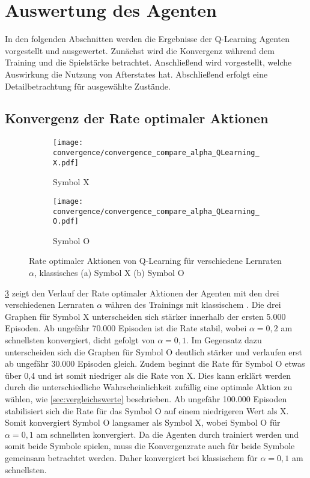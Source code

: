 \section{Auswertung des \qlearning Agenten}
In den folgenden Abschnitten werden die Ergebnisse der Q-Learning Agenten vorgestellt und ausgewertet. Zunächst wird die Konvergenz während dem Training und die Spielstärke betrachtet. Anschließend wird vorgestellt, welche Auswirkung die Nutzung von Afterstates hat. Abschließend erfolgt eine Detailbetrachtung für ausgewählte Zustände.

\subsection{Konvergenz der Rate optimaler Aktionen}
\begin{figure}
\centering
\begin{subfigure}[b]{0.75\textwidth}
    \centering
   \texttt{[image: convergence/convergence\_compare\_alpha\_QLearning\_X.pdf]}
   \caption{Symbol X}
   \label{fig:convergence_compare_alpha_QLearning_X} 
\end{subfigure}

\begin{subfigure}[b]{0.75\textwidth}
    \centering
   \texttt{[image: convergence/convergence\_compare\_alpha\_QLearning\_O.pdf]}
   \caption{Symbol O}
   \label{fig:convergence_compare_alpha_QLearning_O}
\end{subfigure}

\caption[Rate optimaler Aktionen Q-Learning unterschiedliche Lernraten, klassisches \splay]{Rate optimaler Aktionen von Q-Learning für verschiedene Lernraten $\alpha$, klassisches \splay (a) Symbol X (b) Symbol O}
\label{fig:convergence_compare_alpha_QLearning}
\end{figure}


\cref{fig:convergence_compare_alpha_QLearning} zeigt den Verlauf der Rate optimaler Aktionen der \qlearning Agenten mit den drei verschiedenen Lernraten $\alpha$ währen des Trainings mit klassischem \splay. 
Die drei Graphen für Symbol X unterscheiden sich stärker innerhalb der ersten 5.000 Episoden. 
Ab ungefähr 70.000 Episoden ist die Rate stabil, wobei $\alpha = 0,2$ am schnellsten konvergiert, dicht gefolgt von $\alpha=0,1$. 
Im Gegensatz dazu unterscheiden sich die Graphen für Symbol O deutlich stärker und verlaufen erst ab ungefähr 30.000 Episoden gleich. 
Zudem beginnt die Rate für Symbol O etwas über 0,4 und ist somit niedriger als die Rate von X.
Dies kann erklärt werden durch die unterschiedliche Wahrscheinlichkeit zufällig eine optimale Aktion zu wählen, wie \cref{sec:vergleichswerte} beschrieben. 
Ab ungefähr 100.000 Episoden stabilisiert sich die Rate für das Symbol O auf einem niedrigeren Wert als X. 
Somit konvergiert Symbol O langsamer als Symbol X, wobei Symbol O für $\alpha = 0,1$  am schnellsten konvergiert. 
Da die Agenten durch \splay trainiert werden und somit beide Symbole spielen, muss die Konvergenzrate auch für beide Symbole gemeinsam betrachtet werden. 
Daher konvergiert \qlearning bei klassischem \splay für $\alpha=0,1$ am schnellsten. 

